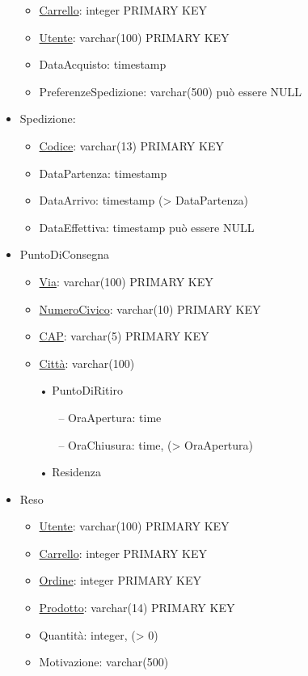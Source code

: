\documentclass[10pt]{article}
\begin{document}
\begin{itemize}
    \begin{itemize}
        \itemsep0em 
        \item \underline{Carrello}: integer PRIMARY KEY
        \item \underline{Utente}: varchar(100) PRIMARY KEY
        \item DataAcquisto: timestamp
        \item PreferenzeSpedizione: varchar(500) può essere NULL
    \end{itemize}
    \item Spedizione:
    \begin{itemize}
        \itemsep0em 
        \item \underline{Codice}: varchar(13) PRIMARY KEY
        \item DataPartenza: timestamp
        \item DataArrivo: timestamp (\textgreater{} DataPartenza)
        \item DataEffettiva: timestamp può essere NULL
    \end{itemize}
    \item PuntoDiConsegna
    \begin{itemize}
        \itemsep0em 
        \item \underline{Via}: varchar(100) PRIMARY KEY
        \item \underline{NumeroCivico}: varchar(10) PRIMARY KEY
        \item \underline{CAP}: varchar(5) PRIMARY KEY
        \item \underline{Città}: varchar(100)
        \item[•] PuntoDiRitiro
        \begin{itemize}
            \itemsep0em 
            \item[–] OraApertura: time
            \item[–] OraChiusura: time, (\textgreater{} OraApertura)
        \end{itemize}
        \item[•] Residenza
    \end{itemize}
    \item Reso
    \begin{itemize}
        \itemsep0em 
        \item \underline{Utente}: varchar(100) PRIMARY KEY
        \item \underline{Carrello}: integer PRIMARY KEY
        \item \underline{Ordine}: integer PRIMARY KEY
        \item \underline{Prodotto}: varchar(14) PRIMARY KEY
        \item Quantità: integer, (\textgreater{} 0)
        \item Motivazione: varchar(500)
    \end{itemize}
\end{itemize}
\end{document}
